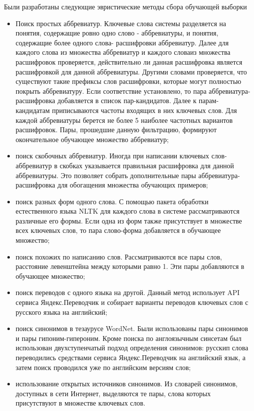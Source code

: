 Были разработаны следующие эвристические методы сбора обучающей выборки
\begin{itemize}
    \item Поиск простых аббревиатур. Ключевые слова системы разделяется на понятия, содержащие ровно одно слово - аббревиатуры, и понятия, содержащие более одного слова- расшифровки аббревиатур. Далее для каждого слова из множества аббревиатур и каждого словаиз множества расшифровок проверяется, действительно ли данная расшифровка является расшифровкой для данной аббревиатуры. Другими словами проверяется, что существуют такие префиксы слов расшифровки, которые могут полностью покрыть аббревиатуру. Если соответствие установлено, то пара аббревиатура-расшифровка добавляется в список пар-кандидатов. Далее к парам-кандидатам приписываются частоты входящих в них ключевых слов. Для каждой аббревиатуры берется не более 5 наиболее частотных вариантов расшифровок. Пары, прошедшие данную фильтрацию, формируют окончательное обучающее множество аббревиатур;
    \item поиск скобочных аббревиатур. Иногда при написании ключевых слов-аббревиатур в скобках указывается правильная расшифровка для данной аббревиатуры. Это позволяет собрать дополнительные пары аббревиатура-расшифровка для обогащения множества обучающих примеров;
    \item поиск разных форм одного слова. С помощью пакета обработки естественного языка NLTK для каждого слова в системе рассматриваются различные его формы. Если одна из форм также присутствует в множестве всех ключевых слов, то пара слово-форма добавляется в обучающее множество;
    \item поиск похожих по написанию слов. Рассматриваются все пары слов, расстояние левенштейна между которыми равно 1. Эти пары добавляются в обучающее множество;
    \item поиск переводов с одного языка на другой. Данный метод использует API сервиса Яндекс.Переводчик и собирает варианты переводов ключевых слов с русского языка на английский;
    \item поиск синонимов в тезаурусе WordNet. Были использованы пары синонимов и пары гипоним-гипероним. Кроме поиска по англоязычным синсетам был использован двухступенчатый подход определения синонимов: русскип слова переводились средствами сервиса Яндекс.Переводчик на английский язык, а затем поиск проводился уже по английским версиям слов;
    \item использование открытых источников синонимов. Из словарей синонимов, доступных в сети Интернет, выделяются те пары, слова которых присутствуют в множестве ключевых слов.
\end{itemize}


